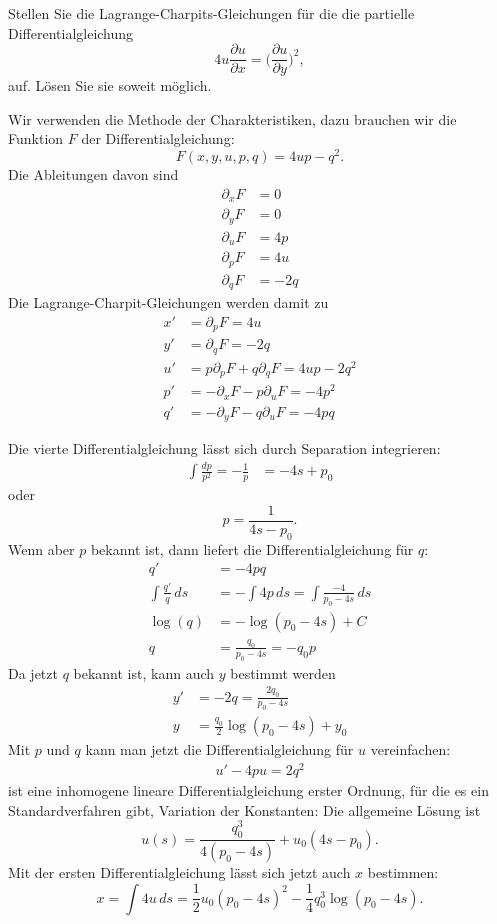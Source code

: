 Stellen Sie die Lagrange-Charpits-Gleichungen für die
die partielle Differentialgleichung
\[
4u\frac{\partial u}{\partial x}=\biggl(\frac{\partial u}{\partial y}\biggr)^2,
\]
auf. Lösen Sie sie soweit möglich.

\begin{loesung}
Wir verwenden die Methode der Charakteristiken, dazu brauchen wir die
Funktion $F$ der Differentialgleichung:
\[
F(x,y,u,p,q)=4up-q^2.
\]
Die Ableitungen davon sind
\begin{align*}
\partial_x F&=0\\
\partial_y F&=0\\
\partial_u F&=4p\\
\partial_p F&=4u\\
\partial_q F&=-2q
\end{align*}
Die Lagrange-Charpit-Gleichungen werden damit zu
\begin{align*}
x'&=\partial_pF=4u\\
y'&=\partial_qF=-2q\\
u'&=p\partial_pF+q\partial_qF=4up-2q^2\\
p'&=-\partial_xF-p\partial_uF=-4p^2\\
q'&=-\partial_yF-q\partial_uF=-4pq
\end{align*}

Die vierte Differentialgleichung lässt sich durch Separation integrieren:
\begin{align*}
\int \frac{dp}{p^2}=-\frac1{p}&=-4s+p_0
\end{align*}
oder 
\[
p=\frac1{4s-p_0}.
\]
Wenn aber $p$ bekannt ist, dann liefert die Differentialgleichung
für $q$:
\begin{align*}
q'&=-4pq
\\
\int \frac{q'}{q}\,ds&=-\int 4p\,ds=\int\frac{-4}{p_0-4s}\,ds
\\
\log(q)&=-\log(p_0-4s) + C\\
q&=\frac{q_0}{p_0-4s}=-q_0p
\end{align*}
Da jetzt $q$ bekannt ist, kann auch $y$ bestimmt werden
\begin{align*}
y'&=-2q=\frac{2q_0}{p_0-4s}\\
y&= \frac{q_0}2\log(p_0-4s)+y_0
\end{align*}
Mit $p$ und $q$ kann man jetzt die Differentialgleichung für
$u$ vereinfachen:
\begin{align*}
u'-4pu=2q^2
\end{align*}
ist eine inhomogene lineare Differentialgleichung erster Ordnung,
für die es ein Standardverfahren gibt, Variation der Konstanten:
Die allgemeine Lösung ist
\[
u(s)=\frac{q_0^3}{4(p_0-4s)} + u_0(4s-p_0).
\]
Mit der ersten Differentialgleichung lässt sich jetzt auch $x$
bestimmen:
\[
x=\int 4u\,ds=
\frac{1}{2} u_0 (p_0-4 s)^2-\frac{1}{4} q_0^3 \log(p_0-4 s).
\]
\end{loesung}
